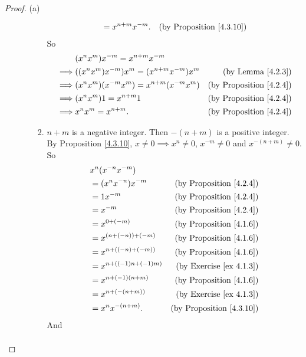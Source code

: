 \begin{proof}{(a)}
\begin{enumerate}[label=(\Roman*)]
\begin{enumerate}[label=(\roman*)]
\begin{enumerate}[label=(\arabic*)]
\begin{align*}
            &= x^{n + m} x^{-m}. & \text{(by Proposition \ref{4.3.10})}
            \end{align*}
            So
            \begin{align*}
            & (x^n x^m) x^{-m} = x^{n + m} x^{-m} \\
            \implies & ((x^n x^m) x^{-m}) x^m = (x^{n + m} x^{-m}) x^m & \text{(by Lemma \ref{4.2.3})} \\
            \implies & (x^n x^m)(x^{-m} x^m) = x^{n + m} (x^{-m} x^m) & \text{(by Proposition \ref{4.2.4})} \\
            \implies & (x^n x^m)1 = x^{n + m} 1 & \text{(by Proposition \ref{4.2.4})} \\
            \implies & x^n x^m = x^{n + m}. & \text{(by Proposition \ref{4.2.4})} \\
            \end{align*}
            \item \(n + m\) is a negative integer.
            Then \(-(n + m)\) is a positive integer.
            By Proposition \ref{4.3.10}, \(x \neq 0 \implies x^n \neq 0\), \(x^{-m} \neq 0\) and \(x^{-(n + m)} \neq 0\).
            So
            \begin{align*}
            & x^n (x^{-n} x^{-m}) \\
            &= (x^n x^{-n})x^{-m} & \text{(by Proposition \ref{4.2.4})} \\
            &= 1x^{-m} & \text{(by Proposition \ref{4.2.4})} \\
            &= x^{-m} & \text{(by Proposition \ref{4.2.4})} \\
            &= x^{0 + (-m)} & \text{(by Proposition \ref{4.1.6})} \\
            &= x^{(n + (-n)) + (-m)} & \text{(by Proposition \ref{4.1.6})} \\
            &= x^{n + ((-n) + (-m))} & \text{(by Proposition \ref{4.1.6})} \\
            &= x^{n + ((-1)n + (-1)m)} & \text{(by Exercise \ref{ex 4.1.3})} \\
            &= x^{n + (-1)(n + m)} & \text{(by Proposition \ref{4.1.6})} \\
            &= x^{n + (-(n + m))} & \text{(by Exercise \ref{ex 4.1.3})} \\
            &= x^n x^{-(n + m)}. & \text{(by Proposition \ref{4.3.10})} \\
            \end{align*}
            And
            \begin{align*}

\end{align*}
\end{enumerate}
\end{enumerate}
\end{enumerate}
\end{proof}
